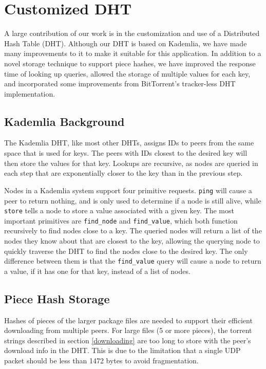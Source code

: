 \documentclass[conference]{IEEEtran}
\begin{document}

\section{Customized DHT}
\label{custom_dht}

A large contribution of our work is in the customization and use of
a Distributed Hash Table (DHT). Although our DHT is based on
Kademlia, we have made many improvements to it to make it suitable
for this application. In addition to a novel storage technique to
support piece hashes, we have improved the response time of looking
up queries, allowed the storage of multiple values for each key, and
incorporated some improvements from BitTorrent's tracker-less DHT
implementation.

\subsection{Kademlia Background}
\label{kademlia}

The Kademlia DHT, like most other DHTs, assigns IDs to peers from
the same space that is used for keys. The peers with IDs closest to
the desired key will then store the values for that key. Lookups are
recursive, as nodes are queried in each step that are exponentially
closer to the key than in the previous step.

Nodes in a Kademlia system support four primitive requests.
\texttt{ping} will cause a peer to return nothing, and is only used
to determine if a node is still alive, while \texttt{store} tells a
node to store a value associated with a given key. The most
important primitives are \texttt{find\_node} and
\texttt{find\_value}, which both function recursively to find nodes
close to a key. The queried nodes will return a list of the nodes
they know about that are closest to the key, allowing the querying
node to quickly traverse the DHT to find the nodes close to the
desired key. The only difference between them is that the
\texttt{find\_value} query will cause a node to return a value, if
it has one for that key, instead of a list of nodes.

\subsection{Piece Hash Storage}
\label{pieces}

Hashes of pieces of the larger package files are needed to support
their efficient downloading from multiple peers.
For large files (5 or more pieces), the torrent strings described in
section \ref{downloading}
are too long to store with the peer's download info in the DHT. This
is due to the limitation that a single UDP packet should be less
than 1472 bytes to avoid fragmentation.
\end{document}
